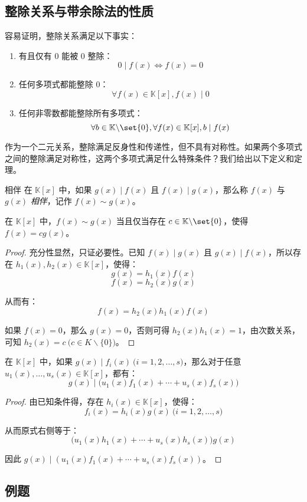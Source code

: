 \subsection{整除关系与带余除法的性质}

容易证明，整除关系满足以下事实：
\begin{enumerate}
	\item 有且仅有 $0$ 能被 $0$ 整除：
	$$
	0 \mid f(x) \Longleftrightarrow f(x) = 0
	$$

	\item 任何多项式都能整除 $0$：
	$$
	\forall f(x) \in \mathbb K[x], f(x) \mid 0
	$$
	\item 任何非零数都能整除所有多项式：
	$$
	\forall b \in \mathbb K \backslash \set{0}, \forall f(x) \in \mathbb K[x], b \mid f(x)
	$$
\end{enumerate}

作为一个二元关系，整除满足反身性和传递性，但不具有对称性。如果两个多项式之间的整除满足对称性，这两个多项式满足什么特殊条件？我们给出以下定义和定理。

\begin{definition}{相伴}
	在 $\mathbb K[x]$ 中，如果 $g(x) \mid f(x)$ 且 $f(x) \mid g(x)$，那么称 $f(x)$ 与 $g(x)$ \emph{相伴}，记作 $f(x) \sim g(x)$。
\end{definition}

\begin{proposition}
	在 $\mathbb K[x]$ 中，$f(x) \sim g(x)$ 当且仅当存在 $c \in \mathbb K \backslash \set{0}$，使得 $f(x) = c g(x)$。
\end{proposition}

\begin{proof}
	充分性显然，只证必要性。已知 $f(x) \mid g(x)$ 且 $g(x) \mid f(x)$，所以存在 $h_1(x), h_2(x) \in \mathbb K[x]$，使得：
	$$
	g(x) = h_1(x) f(x)
	$$$$
	f(x) = h_2(x) g(x)
	$$

	从而有：
	$$
	f(x) = h_2(x) h_1(x) f(x)
	$$

	如果 $f(x) = 0$，那么 $g(x) = 0$，否则可得 $h_2(x) h_1(x) = 1$，由次数关系，可知 $h_2(x) = c \pod{c \in K \backslash \{0\}}$。
\end{proof}

\begin{proposition}
	在 $\mathbb K[x]$ 中，如果 $g(x) \mid f_i(x) \pod{i = 1, 2, \ldots, s}$，那么对于任意 $u_1(x), \ldots, u_s(x) \in \mathbb K[x]$，都有：
	$$
	g(x) \mid \bigl( u_1(x) f_1(x) + \cdots + u_s(x) f_s(x) \bigr)
	$$
\end{proposition}

\begin{proof}
	由已知条件得，存在 $h_i(x) \in \mathbb K[x]$，使得：
	$$
	f_i(x) = h_i(x) g(x) \pod{i = 1, 2, \ldots, s}
	$$

	从而原式右侧等于：
	$$
	\bigl( u_1(x) h_1(x) + \cdots + u_s(x) h_s(x) \bigr) g(x)
	$$

	因此 $g(x) \mid (u_1(x) f_1(x) + \cdots + u_s(x) f_s(x))$。
\end{proof}

\subsection{例题}

